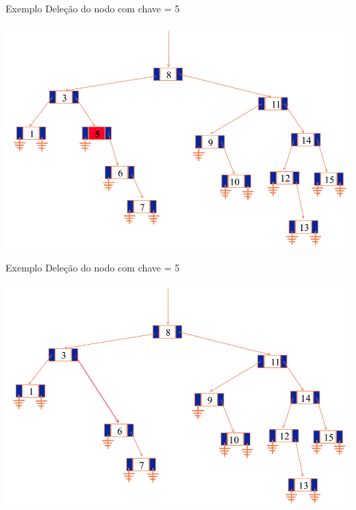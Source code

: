 \documentclass[12pt,table,xcolor={dvipsnames}]{beamer}
\begin{document}
\begin{frame}[fragile]{Exemplo}
	Deleção do nodo com chave = 5
	\begin{center}
		\includegraphics[scale=.3]{arv10.png} 
	\end{center}
\end{frame}

\begin{frame}[fragile]{Exemplo}
	Deleção do nodo com chave = 5
	\begin{center}
		\includegraphics[scale=.3]{arv11.png} 
	\end{center}
\end{frame}
\end{document}

